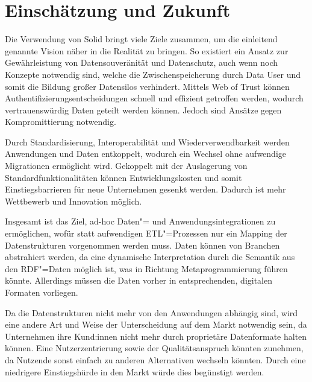 
\section{Einschätzung und Zukunft}

Die Verwendung von Solid bringt viele Ziele zusammen, um die einleitend genannte Vision näher in die Realität zu bringen.
So existiert ein Ansatz zur Gewährleistung von Datensouveränität und Datenschutz, auch wenn noch Konzepte notwendig sind, welche die Zwischenspeicherung durch Data User und somit die Bildung großer Datensilos verhindert.
Mittels Web of Trust können Authentifizierungsentscheidungen schnell und effizient getroffen werden, wodurch vertrauenswürdig Daten geteilt werden können.
Jedoch sind Ansätze gegen Kompromittierung notwendig.

Durch Standardisierung, Interoperabilität und Wiederverwendbarkeit werden Anwendungen und Daten entkoppelt, wodurch ein Wechsel ohne aufwendige Migrationen ermöglicht wird.
Gekoppelt mit der Auslagerung von Standardfunktionalitäten können Entwicklungskosten und somit Einstiegsbarrieren für neue Unternehmen gesenkt werden.
Dadurch ist mehr Wettbewerb und Innovation möglich.

Insgesamt ist das Ziel, ad-hoc Daten"= und Anwendungsintegrationen zu ermöglichen, wofür statt aufwendigen ETL"=Prozessen nur ein Mapping der Datenstrukturen vorgenommen werden muss.
Daten können von Branchen abstrahiert werden, da eine dynamische Interpretation durch die Semantik aus den RDF"=Daten möglich ist, was in Richtung Metaprogrammierung führen könnte.
Allerdings müssen die Daten vorher in entsprechenden, digitalen Formaten vorliegen.

Da die Datenstrukturen nicht mehr von den Anwendungen abhängig sind, wird eine andere Art und Weise der Unterscheidung auf dem Markt notwendig sein, da Unternehmen ihre Kund:innen nicht mehr durch proprietäre Datenformate halten können.
Eine Nutzerzentrierung sowie der Qualitätsanspruch könnten zunehmen, da Nutzende sonst einfach zu anderen Alternativen wechseln könnten.
Durch eine niedrigere Einstiegshürde in den Markt würde dies begünstigt werden.
